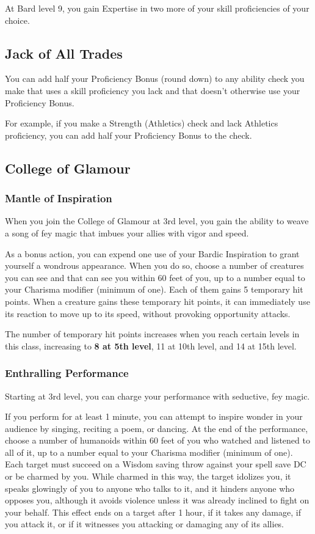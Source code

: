 \documentclass[letterpaper,openany,oneside,twocolumn]{book}
\begin{document}
At Bard level 9, you gain Expertise in two more of your skill proficiencies of your choice.
\subsection*{Jack of All Trades}
You can add half your Proficiency Bonus (round down) to any ability check you make that uses a skill proficiency you lack and that doesn't otherwise use your Proficiency Bonus.

For example, if you make a Strength (Athletics) check and lack Athletics proficiency, you can add half your Proficiency Bonus to the check.
\subsection*{College of Glamour}
\subsubsection*{Mantle of Inspiration}
When you join the College of Glamour at 3rd level, you gain the ability to weave a song of fey magic that imbues your allies with vigor and speed.

As a bonus action, you can expend one use of your Bardic Inspiration to grant yourself a wondrous appearance. When you do so, choose a number of creatures you can see and that can see you within 60 feet of you, up to a number equal to your Charisma modifier (minimum of one). Each of them gains 5 temporary hit points. When a creature gains these temporary hit points, it can immediately use its reaction to move up to its speed, without provoking opportunity attacks.

The number of temporary hit points increases when you reach certain levels in this class, increasing to \textbf{8 at 5th level}, 11 at 10th level, and 14 at 15th level.
\subsubsection*{Enthralling Performance}
Starting at 3rd level, you can charge your performance with seductive, fey magic.

If you perform for at least 1 minute, you can attempt to inspire wonder in your audience by singing, reciting a poem, or dancing. At the end of the performance, choose a number of humanoids within 60 feet of you who watched and listened to all of it, up to a number equal to your Charisma modifier (minimum of one). Each target must succeed on a Wisdom saving throw against your spell save DC or be charmed by you. While charmed in this way, the target idolizes you, it speaks glowingly of you to anyone who talks to it, and it hinders anyone who opposes you, although it avoids violence unless it was already inclined to fight on your behalf. This effect ends on a target after 1 hour, if it takes any damage, if you attack it, or if it witnesses you attacking or damaging any of its allies.
\end{document}
